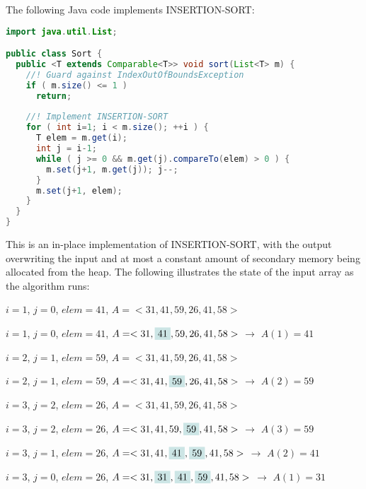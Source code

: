 \documentclass[a4paper,12pt]{article}
\begin{document}

The following Java code implements INSERTION-SORT:

\begin{lstlisting}[language=Java]
import java.util.List;

public class Sort {
  public <T extends Comparable<T>> void sort(List<T> m) {
    //! Guard against IndexOutOfBoundsException
    if ( m.size() <= 1 )
      return;
      
    //! Implement INSERTION-SORT
    for ( int i=1; i < m.size(); ++i ) {
      T elem = m.get(i);
      int j = i-1;
      while ( j >= 0 && m.get(j).compareTo(elem) > 0 ) {
        m.set(j+1, m.get(j)); j--;
      }
      m.set(j+1, elem);
    }
  }
}
\end{lstlisting}

This is an in-place implementation of INSERTION-SORT, with the output overwriting the input and at most a constant amount of secondary memory being allocated from the heap. 
The following illustrates the state of the input array as the algorithm runs:

\vspace{5mm}
$i=1$, $j=0$, $elem = 41$, $A = <31, 41, 59, 26, 41, 58>$

$i=1$, $j=0$, $elem = 41$, $A = <31, \colorbox{highlightcolor}{41}, 59, 26, 41, 58>$ $\rightarrow$ $A(1) = 41$

$i=2$, $j=1$, $elem = 59$, $A = <31, 41, 59, 26, 41, 58>$

$i=2$, $j=1$, $elem = 59$, $A = <31, 41, \colorbox{highlightcolor}{59}, 26, 41, 58>$ $\rightarrow$ $A(2) = 59$

$i=3$, $j=2$, $elem = 26$, $A = <31, 41, 59, 26, 41, 58>$ 

$i=3$, $j=2$, $elem = 26$, $A = <31, 41, 59, \colorbox{highlightcolor}{59}, 41, 58>$ $\rightarrow$ $A(3) = 59$

$i=3$, $j=1$, $elem = 26$, $A = <31, 41, \colorbox{highlightcolor}{41}, \colorbox{highlightcolor}{59}, 41, 58>$ $\rightarrow$ $A(2) = 41$
 
$i=3$, $j=0$, $elem = 26$, $A = <31,\colorbox{highlightcolor}{31}, \colorbox{highlightcolor}{41}, \colorbox{highlightcolor}{59}, 41, 58>$ $\rightarrow$  $A(1) = 31$
\end{document}
